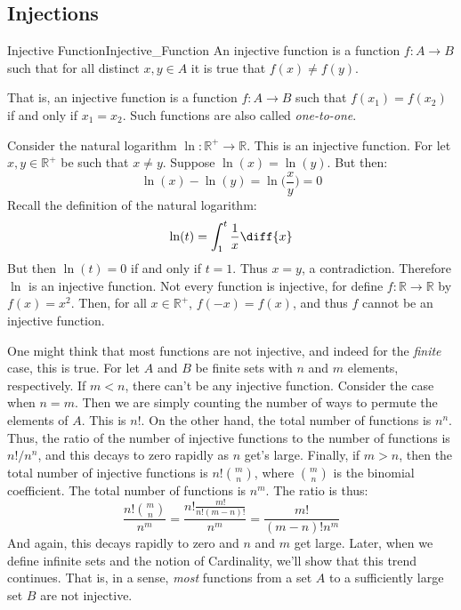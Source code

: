     \subsection{Injections}
        \begin{fdefinition}{Injective Function}{Injective_Function}
            An \gls{injective function} is a function $f:A\rightarrow{B}$ such
            that for all distinct $x,y\in{A}$ it is true that $f(x)\ne{f}(y)$.
        \end{fdefinition}
        That is, an injective function is a function $f:A\rightarrow{B}$ such
        that $f(x_{1})=f(x_{2})$ if and only if $x_{1}=x_{2}$. Such functions
        are also called \textit{one-to-one}.
        \begin{example}
            Consider the natural logarithm
            $\ln:\mathbb{R}^{+}\rightarrow\mathbb{R}$. This is an injective
            function. For let $x,y\in\mathbb{R}^{+}$ be such that $x\ne{y}$.
            Suppose $\ln(x)=\ln(y)$. But then:
            \begin{equation}
                \ln(x)-\ln(y)=\ln\Big(\frac{x}{y}\Big)=0
            \end{equation}
            Recall the definition of the natural logarithm:
            \begin{equation}
                \ln(t)=\int_{1}^{t}\frac{1}{x}\diff{x}
            \end{equation}
            But then $\ln(t)=0$ if and only if $t=1$. Thus $x=y$, a
            contradiction. Therefore $\ln$ is an injective function. Not every
            function is injective, for define
            $f:\mathbb{R}\rightarrow\mathbb{R}$ by $f(x)=x^{2}$. Then, for all
            $x\in\mathbb{R}^{+}$, $f(\minus{x})=f(x)$, and thus $f$ cannot be an
            injective function.
        \end{example}
        One might think that most functions are not injective, and indeed for
        the \textit{finite} case, this is true. For let $A$ and $B$ be finite
        sets with $n$ and $m$ elements, respectively. If $m<n$, there can't be
        any injective function. Consider the case when $n=m$. Then we are simply
        counting the number of ways to permute the elements of $A$. This is
        $n!$. On the other hand, the total number of functions is $n^{n}$. Thus,
        the ratio of the number of injective functions to the number of
        functions is $n!/n^{n}$, and this decays to zero rapidly as $n$ get's
        large. Finally, if $m>n$, then the total number of injective functions
        is $n!\binom{m}{n}$, where $\binom{m}{n}$ is the binomial coefficient.
        The total number of functions is $n^{m}$. The ratio is thus:
        \begin{equation}
            \frac{n!\binom{m}{n}}{n^{m}}=\frac{n!\frac{m!}{n!(m-n)!}}{n^{m}}
                                        =\frac{m!}{(m-n)!n^{m}}
        \end{equation}
        And again, this decays rapidly to zero and $n$ and $m$
        get large. Later, when we define infinite sets
        and the notion of Cardinality, we'll show that this
        trend continues. That is, in a sense, \textit{most}
        functions from a set $A$ to a sufficiently large set
        $B$ are not injective.
